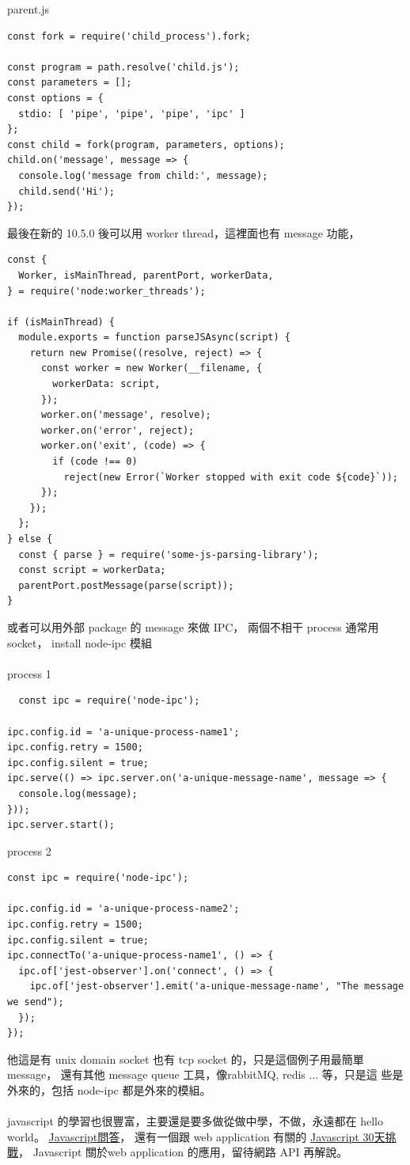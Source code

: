   parent.js
  \begin{verbatim}
const fork = require('child_process').fork;

const program = path.resolve('child.js');
const parameters = [];
const options = {
  stdio: [ 'pipe', 'pipe', 'pipe', 'ipc' ]
};
const child = fork(program, parameters, options);
child.on('message', message => {
  console.log('message from child:', message);
  child.send('Hi');
});
  \end{verbatim}
  最後在新的 10.5.0 後可以用 worker thread，這裡面也有 message 功能，
  \begin{verbatim}
const {
  Worker, isMainThread, parentPort, workerData,
} = require('node:worker_threads');

if (isMainThread) {
  module.exports = function parseJSAsync(script) {
    return new Promise((resolve, reject) => {
      const worker = new Worker(__filename, {
        workerData: script,
      });
      worker.on('message', resolve);
      worker.on('error', reject);
      worker.on('exit', (code) => {
        if (code !== 0)
          reject(new Error(`Worker stopped with exit code ${code}`));
      });
    });
  };
} else {
  const { parse } = require('some-js-parsing-library');
  const script = workerData;
  parentPort.postMessage(parse(script));
} 
  \end{verbatim}
  或者可以用外部 package 的 message 來做 IPC，
  兩個不相干 process 通常用 socket， install node-ipc 模組
  \\\\
  process 1
  \begin{verbatim}
  const ipc = require('node-ipc');

ipc.config.id = 'a-unique-process-name1';
ipc.config.retry = 1500;
ipc.config.silent = true;
ipc.serve(() => ipc.server.on('a-unique-message-name', message => {
  console.log(message);
}));
ipc.server.start();
  \end{verbatim}
  process 2
  \begin{verbatim}
const ipc = require('node-ipc');

ipc.config.id = 'a-unique-process-name2';
ipc.config.retry = 1500;
ipc.config.silent = true;
ipc.connectTo('a-unique-process-name1', () => {
  ipc.of['jest-observer'].on('connect', () => {
    ipc.of['jest-observer'].emit('a-unique-message-name', "The message we send");
  });
});
  \end{verbatim}
  他這是有 unix domain socket 也有 tcp socket 的，只是這個例子用最簡單
  message， 還有其他 message queue 工具，像rabbitMQ, redis ... 等，只是這
  些是外來的，包括 node-ipc 都是外來的模組。
  \\\\
  javascript 的學習也很豐富，主要還是要多做從做中學，不做，永遠都在 
  hello world。
  \href{https://github.com/lydiahallie/javascript-questions}{Javascript問答}，
  還有一個跟 web application 有關的
  \href{https://github.com/wesbos/JavaScript30}{Javascript 30天挑戰}，
  Javascript 關於web application 的應用，留待網路 API 再解說。

